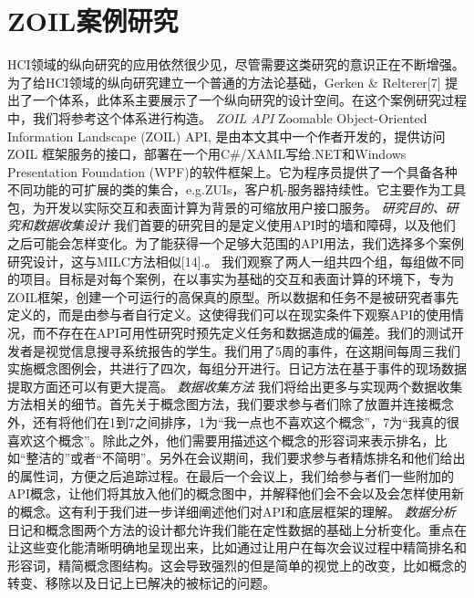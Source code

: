 \section*{ZOIL案例研究}
HCI领域的纵向研究的应用依然很少见，尽管需要这类研究的意识正在不断增强。为了给HCI领域的纵向研究建立一个普通的方法论基础，Gerken \& Relterer[7] 提出了一个体系，此体系主要展示了一个纵向研究的设计空间。在这个案例研究过程中，我们将参考这个体系进行构造。
\textit{ZOIL API}
Zoomable Object-Oriented Information Landscape (ZOIL) API, 是由本文其中一个作者开发的，提供访问ZOIL 框架服务的接口，部署在一个用C\#/XAML写给.NET和Windows Presentation Foundation (WPF)的软件框架上。它为程序员提供了一个具备各种不同功能的可扩展的类的集合，e.g.ZUIs，客户机-服务器持续性。它主要作为工具包，为开发以实际交互和表面计算为背景的可缩放用户接口服务。
\textit{研究目的、研究和数据收集设计}
我们首要的研究目的是定义使用API时的墙和障碍，以及他们之后可能会怎样变化。为了能获得一个足够大范围的API用法，我们选择多个案例研究设计，这与MILC方法相似[14].。 我们观察了两人一组共四个组，每组做不同的项目。目标是对每个案例，在以事实为基础的交互和表面计算的环境下，专为ZOIL框架，创建一个可运行的高保真的原型。所以数据和任务不是被研究者事先定义的，而是由参与者自行定义。这使得我们可以在现实条件下观察API的使用情况，而不存在在API可用性研究时预先定义任务和数据造成的偏差。我们的测试开发者是视觉信息搜寻系统报告的学生。我们用了5周的事件，在这期间每周三我们实施概念图例会，共进行了四次，每组分开进行。日记方法在基于事件的现场数据提取方面还可以有更大提高。
\textit{数据收集方法}
我们将给出更多与实现两个数据收集方法相关的细节。首先关于概念图方法，我们要求参与者们除了放置并连接概念外，还有将他们在1到7之间排序，1为“我一点也不喜欢这个概念”，7为“我真的很喜欢这个概念”。除此之外，他们需要用描述这个概念的形容词来表示排名，比如“整洁的”或者“不简明”。另外在会议期间，我们要求参与者精炼排名和他们给出的属性词，方便之后追踪过程。在最后一个会议上，我们给参与者们一些附加的API概念，让他们将其放入他们的概念图中，并解释他们会不会以及会怎样使用新的概念。这有利于我们进一步详细阐述他们对API和底层框架的理解。
\textit{数据分析}
日记和概念图两个方法的设计都允许我们能在定性数据的基础上分析变化。重点在让这些变化能清晰明确地呈现出来，比如通过让用户在每次会议过程中精简排名和形容词，精简概念图结构。这会导致强烈的但是简单的视觉上的改变，比如概念的转变、移除以及日记上已解决的被标记的问题。
